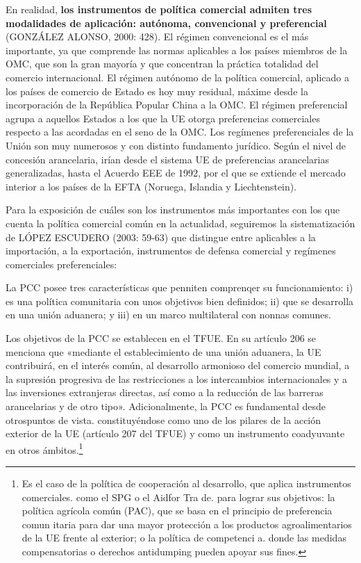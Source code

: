 \documentclass[10pt,a4paper]{article}
\begin{document}
En realidad, \textbf{los instrumentos de política comercial admiten tres modalidades de aplicación: autónoma, convencional y preferencial} (GONZÁLEZ ALONSO, 2000: 428). El régimen convencional es el más importante, ya que comprende las normas aplicables a los países miembros de la OMC, que son la gran mayoría y que concentran la práctica totalidad del comercio internacional. El régimen autónomo de la política comercial, aplicado a los países de comercio de Estado es hoy muy residual, máxime desde la incorporación de la República Popular China a la OMC. El régimen preferencial agrupa a aquellos Estados a los que la UE otorga preferencias comerciales respecto a las acordadas en el seno de la OMC. Los regímenes preferenciales de la Unión son muy numerosos y con distinto fundamento jurídico. Según el nivel de concesión arancelaria, irían desde el sistema UE de preferencias arancelarias generalizadas, hasta el Acuerdo EEE de 1992, por el que se extiende el mercado interior a los países de la EFTA (Noruega, Islandia y Liechtenstein). 

Para la exposición de cuáles son los instrumentos más importantes con los que cuenta la política comercial común en la actualidad, seguiremos la sistematización de LÓPEZ ESCUDERO (2003: 59-63) que distingue entre aplicables a la importación, a la exportación, instrumentos de defensa comercial y regímenes comerciales preferenciales:


















La PCC posee tres características que penniten comprenqer su funcionamiento: i) es una política comunitaria con unos objetivos bien definidos; ii) que se desarrolla en una unión aduanera; y iii) en un marco multilateral con nonnas comunes.

Los objetivos de la PCC se establecen en el TFUE. En su artículo 206 se menciona que «mediante el establecimiento de una unión aduanera, la UE contribuirá, en el interés común, al desarrollo armonioso del comercio mundial, a la supresión progresiva de las restricciones a los intercambios internacionales y a las inversiones extranjeras directas, así como a la reducción de las barreras arancelarias y de otro tipo». Adicionalmente, la PCC es fundamental desde otrospuntos de vista. constituyéndose como uno de los pilares de la acción exterior de la UE (artículo 207 del TFUE) y como un instrumento coadyuvante en otros ámbitos.\footnote{%
    Es el caso de la política de cooperación al desarrollo, que aplica instrumentos comerciales. como el SPG o el Aidfor Tra de. para lograr sus objetivos: la política agrícola común (PAC), que se basa en el principio de preferencia comun itaria para dar una mayor protección a los productos agroalimentarios de la UE frente al exterior; o la política de competenci a. donde las medidas compensatorias o derechos antidumping pueden apoyar sus fines.
} 
\end{document}

